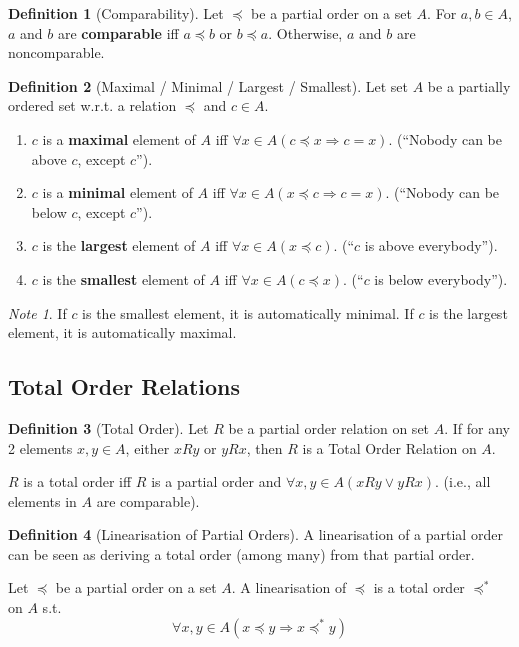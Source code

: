 \documentclass{article}
\theoremstyle{plain}
\theoremstyle{definition}
\newtheorem*{definition}{Definition}
\theoremstyle{remark}
\newtheorem*{note}{Note}
\begin{document}
\begin{definition}[Comparability]
    Let $\preceq$ be a partial order on a set $A$. For $a,b \in A$, $a$ and $b$ are \textbf{comparable} iff $a \preceq b$ or $b \preceq a$. Otherwise, $a$ and $b$ are noncomparable.
\end{definition}

\begin{definition}[Maximal / Minimal / Largest / Smallest]
    Let set $A$ be a partially ordered set w.r.t. a relation $\preceq$ and $c \in A$.
    \begin{enumerate}[label=\arabic*.]
        \item $c$ is a \textbf{maximal} element of $A$ iff $\forall x \in A (c \preceq x \Rightarrow c = x)$. (``Nobody can be above $c$, except $c$'').
        \item $c$ is a \textbf{minimal} element of $A$ iff $\forall x \in A (x \preceq c \Rightarrow c = x)$. (``Nobody can be below $c$, except $c$'').
        \item $c$ is the \textbf{largest} element of $A$ iff $\forall x \in A (x \preceq c)$. (``$c$ is above everybody'').
        \item $c$ is the \textbf{smallest} element of $A$ iff $\forall x \in A (c \preceq x)$. (``$c$ is below everybody'').
    \end{enumerate}
\end{definition}
    
\begin{note}
    If $c$ is the smallest element, it is automatically minimal. If $c$ is the largest element, it is automatically maximal.
\end{note}

\subsection{Total Order Relations}
\begin{definition}[Total Order]
    Let $R$ be a partial order relation on set $A$. If for any 2 elements $x, y \in A$, either $xRy$ or $yRx$, then $R$ is a Total Order Relation on $A$.
    
    $R$ is a total order iff $R$ is a partial order and $\forall x, y \in A (xRy \vee yRx)$. (i.e., all elements in $A$ are comparable).
\end{definition}

\begin{definition}[Linearisation of Partial Orders]
    A linearisation of a partial order can be seen as deriving a total order (among many) from that partial order.
    
    Let $\preceq$ be a partial order on a set $A$. A linearisation of $\preceq$ is a total order $\preceq^*$ on $A$ s.t.
    \[ \forall x,y \in A (x \preceq y \Rightarrow x \preceq^* y) \]
\end{definition}
\end{document}
